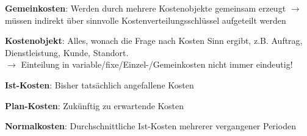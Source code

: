 \textbf{Gemeinkosten}: Werden durch mehrere Kostenobjekte gemeinsam erzeugt $\rightarrow$ müssen indirekt über sinnvolle Kostenverteilungsschlüssel aufgeteilt werden

\textbf{Kostenobjekt}: Alles, wonach die Frage nach Kosten Sinn ergibt, z.B. Auftrag, Dienstleistung, Kunde, Standort.\\
$\rightarrow$ Einteilung in variable/fixe/Einzel-/Gemeinkosten nicht immer eindeutig!

\textbf{Ist-Kosten}: Bisher tatsächlich angefallene Kosten

\textbf{Plan-Kosten}: Zukünftig zu erwartende Kosten

\textbf{Normalkosten}: Durchschnittliche Ist-Kosten mehrerer vergangener Perioden
